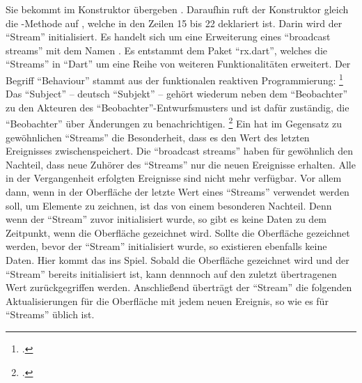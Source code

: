 Sie bekommt  im Konstruktor übergeben .
Daraufhin ruft der Konstruktor gleich die -Methode auf , welche in den Zeilen 15 bis 22 deklariert ist.
Darin wird der \enquote{Stream}   initialisiert.
Es handelt sich um eine Erweiterung eines \enquote{broadcast streams} mit dem Namen  .
Es entstammt dem Paket \enquote{rx.dart},
welches die \enquote{Streams} in \enquote{Dart} um eine Reihe von weiteren Funktionalitäten erweitert.
Der Begriff \enquote{Behaviour} stammt aus der funktionalen reaktiven Programmierung:
\footcite[][S. 1]{ElliottHudak97:Fran}
Das \enquote{Subject}
-- deutsch \enquote{Subjekt} --
gehört wiederum neben dem \enquote{Beobachter} zu den Akteuren des \enquote{Beobachter}-Entwurfsmusters
und ist dafür zuständig, die \enquote{Beobachter} über Änderungen zu benachrichtigen.
\footcite[Vgl.][S. 288]{gamma2009entwurfsmuster} 
Ein  hat im Gegensatz zu gewöhnlichen \enquote{Streams} die Besonderheit,
dass es den Wert des letzten Ereignisses zwischenspeichert.
Die \enquote{broadcast streams} haben für gewöhnlich den Nachteil,
dass neue Zuhörer des \enquote{Streams} nur die neuen Ereignisse erhalten.
Alle in der Vergangenheit erfolgten Ereignisse sind nicht mehr verfügbar.
Vor allem dann,
wenn in der Oberfläche der letzte Wert eines \enquote{Streams} verwendet werden soll,
um Elemente zu zeichnen,
ist das von einem besonderen Nachteil.
Denn wenn der \enquote{Stream} zuvor initialisiert wurde,
so gibt es keine Daten zu dem Zeitpunkt,
wenn die Oberfläche gezeichnet wird.
Sollte die Oberfläche gezeichnet werden,
bevor der \enquote{Stream} initialisiert wurde,
so  existieren ebenfalls keine Daten.
Hier kommt das  ins Spiel.
Sobald die Oberfläche gezeichnet wird und der \enquote{Stream} bereits initialisiert ist,
kann dennnoch auf den zuletzt übertragenen Wert zurückgegriffen werden.
Anschließend überträgt der \enquote{Stream} die folgenden Aktualisierungen für die Oberfläche mit jedem neuen Ereignis,
so wie es für \enquote{Streams} üblich ist.

